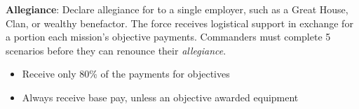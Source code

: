 \item {\bfseries Allegiance}: Declare allegiance for to a single employer, such as a Great House, Clan, or wealthy benefactor.
The force receives logistical support in exchange for a portion each mission's objective payments.
Commanders must complete 5 scenarios before they can renounce their \emph{allegiance}.

\begin{itemize}

\item Receive only 80\% of the payments for objectives

\item Always receive base pay, unless an objective awarded equipment

\end{itemize}
